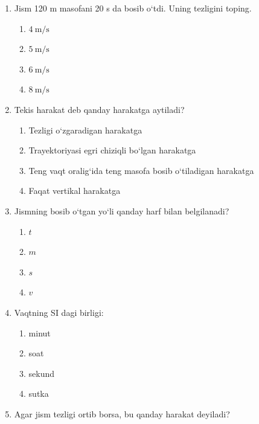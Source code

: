 \begin{enumerate}[label=\textbf{\arabic*.}]
\item Jism 120 m masofani 20 s da bosib o‘tdi. Uning tezligini toping.

\begin{enumerate}[label=\Alph*)]
    \item $4 \ \text{m/s}$
    \item $5 \ \text{m/s}$
    \item $6 \ \text{m/s}$
    \item $8 \ \text{m/s}$
\end{enumerate}



\item Tekis harakat deb qanday harakatga aytiladi?

\begin{enumerate}[label=\Alph*)]
    \item Tezligi o‘zgaradigan harakatga
    \item Trayektoriyasi egri chiziqli bo‘lgan harakatga
    \item Teng vaqt oralig‘ida teng masofa bosib o‘tiladigan harakatga
    \item Faqat vertikal harakatga
\end{enumerate}



\item Jismning bosib o‘tgan yo‘li qanday harf bilan belgilanadi?

\begin{enumerate}[label=\Alph*)]
    \item $t$
    \item $m$
    \item $s$
    \item $v$
\end{enumerate}



\item Vaqtning SI dagi birligi:

\begin{enumerate}[label=\Alph*)]
    \item minut
    \item soat
    \item sekund
    \item sutka
\end{enumerate}



\item Agar jism tezligi ortib borsa, bu qanday harakat deyiladi?


\end{enumerate}
